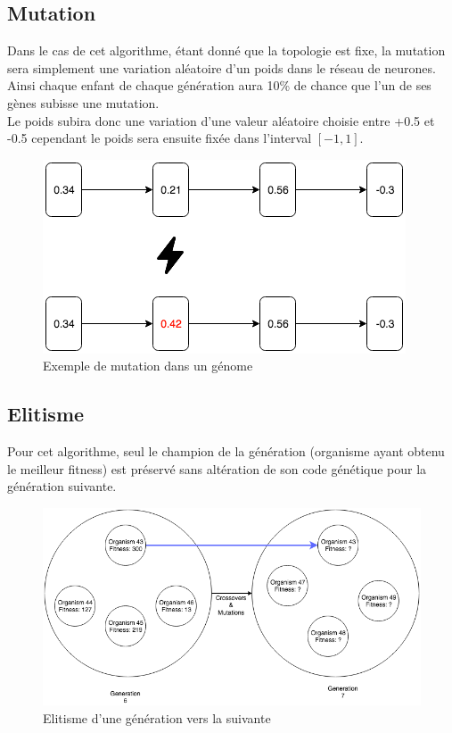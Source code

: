 \documentclass{article}
\begin{document}
\subsection{Mutation}

Dans le cas de cet algorithme, étant donné que la topologie est fixe, la mutation sera simplement une variation aléatoire d'un poids dans le réseau de neurones. Ainsi chaque enfant de chaque génération aura 10\% de chance que l'un de ses gènes subisse une mutation.\\
Le poids subira donc une variation d'une valeur aléatoire choisie entre +0.5 et -0.5 cependant le poids sera ensuite fixée dans l'interval $[-1, 1]$.

\begin{figure}[H]
\begin{center}
	\includegraphics[scale=0.6]{mutation.png}
	\caption{Exemple de mutation dans un génome}
\end{center}
\end{figure}

\subsection{Elitisme}

Pour cet algorithme, seul le champion de la génération (organisme ayant obtenu le meilleur fitness) est préservé sans altération de son code génétique pour la génération suivante.

\begin{figure}[H]
\begin{center}
	\includegraphics[scale=0.5]{elitism.png}
	\caption{Elitisme d'une génération vers la suivante}
\end{center}
\end{figure}
\end{document}
